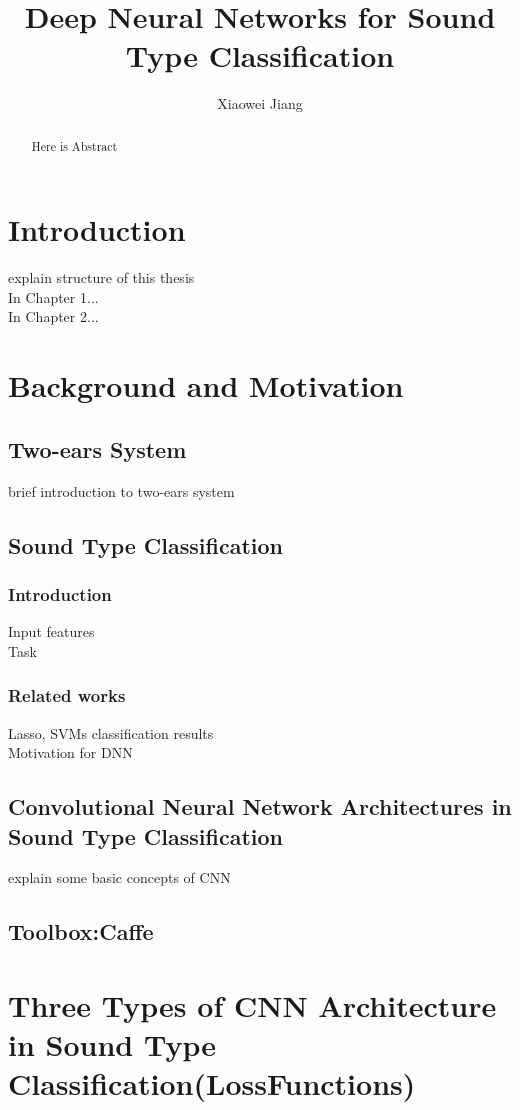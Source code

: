 \documentclass[11pt,a4paper]{article}
\title{Deep Neural Networks for Sound Type Classification}
\author{Xiaowei Jiang}
\begin{document}
\maketitle

\begin{abstract}
	Here is Abstract
\end{abstract}

\tableofcontents


\section{Introduction}
explain structure of this thesis\\
In Chapter 1...\\
In Chapter 2...\\

\section{Background and Motivation}
\subsection{Two-ears System}
brief introduction to two-ears system
\subsection{Sound Type Classification}
\subsubsection{Introduction}
Input features \\
Task\\
\subsubsection{Related works}
Lasso, SVMs classification results\\
Motivation for DNN
\subsection{Convolutional Neural Network Architectures in Sound Type Classification}
explain some basic concepts of CNN
\subsection{Toolbox:Caffe}

\section{Three Types of CNN Architecture in Sound Type Classification(LossFunctions)}
\end{document}
